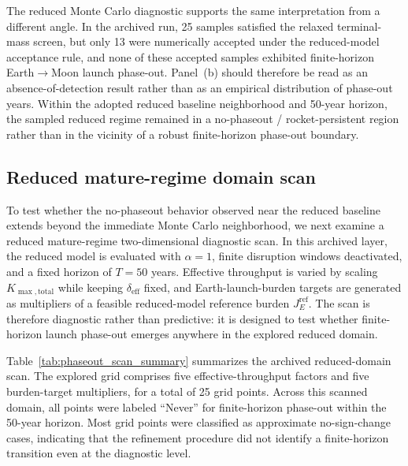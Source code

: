 \documentclass[12pt]{article}
\begin{document}
The reduced Monte Carlo diagnostic supports the same interpretation from a different angle. In the archived run, 25 samples satisfied the relaxed terminal-mass screen, but only 13 were numerically accepted under the reduced-model acceptance rule, and none of these accepted samples exhibited finite-horizon Earth\(\to\)Moon launch phase-out. Panel~(b) should therefore be read as an absence-of-detection result rather than as an empirical distribution of phase-out years. Within the adopted reduced baseline neighborhood and 50-year horizon, the sampled reduced regime remained in a no-phaseout / rocket-persistent region rather than in the vicinity of a robust finite-horizon phase-out boundary.

\subsection{Reduced mature-regime domain scan}
\label{subsec:phaseout_heatmap}

To test whether the no-phaseout behavior observed near the reduced baseline extends beyond the immediate Monte Carlo neighborhood, we next examine a reduced mature-regime two-dimensional diagnostic scan. In this archived layer, the reduced model is evaluated with \(\alpha=1\), finite disruption windows deactivated, and a fixed horizon of \(T=50\) years. Effective throughput is varied by scaling \(K_{\max,\mathrm{total}}\) while keeping \(\delta_{\mathrm{eff}}\) fixed, and Earth-launch-burden targets are generated as multipliers of a feasible reduced-model reference burden \(J_E^{\mathrm{ref}}\). The scan is therefore diagnostic rather than predictive: it is designed to test whether finite-horizon launch phase-out emerges anywhere in the explored reduced domain.

Table~\ref{tab:phaseout_scan_summary} summarizes the archived reduced-domain scan. The explored grid comprises five effective-throughput factors and five burden-target multipliers, for a total of 25 grid points. Across this scanned domain, all points were labeled ``Never'' for finite-horizon phase-out within the 50-year horizon. Most grid points were classified as approximate no-sign-change cases, indicating that the refinement procedure did not identify a finite-horizon transition even at the diagnostic level.
\end{document}
